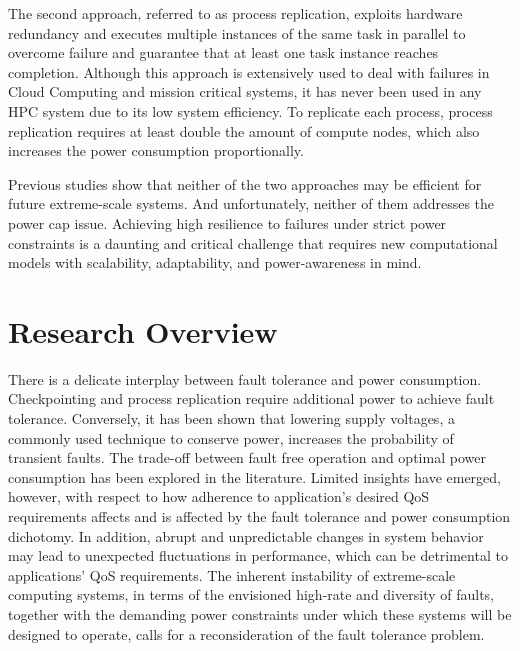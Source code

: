The second approach, referred to as process replication, exploits hardware redundancy and executes multiple instances of the same task 
in parallel to overcome failure and guarantee that at least one task instance reaches completion. Although this approach is extensively used 
to deal with failures in 
Cloud Computing and mission critical systems, it has 
never been used in any HPC system due to its low system efficiency. To replicate each process, process replication requires 
at least double the amount of compute nodes, which also increases the power consumption proportionally. 

Previous studies show that neither of the two approaches may be efficient for future extreme-scale systems. And unfortunately, neither 
of them addresses the power cap issue. 
Achieving high resilience to failures under strict power constraints is a daunting and critical challenge that requires new 
computational models with scalability, adaptability, and power-awareness in mind. 
 
\section{Research Overview}

There is a delicate interplay between fault tolerance and power consumption. Checkpointing and process replication require 
additional power to achieve fault tolerance. Conversely, it has been shown that lowering supply voltages, a commonly used 
technique to conserve power, increases the probability of transient faults. The trade-off between fault free operation and 
optimal power consumption has been explored in the literature. Limited insights have emerged, however, with respect to how 
adherence to application's desired QoS requirements affects and is affected by the fault tolerance and power consumption 
dichotomy. In addition, abrupt and unpredictable changes in system behavior may lead to unexpected fluctuations in performance, 
which can be detrimental to applications’ QoS requirements. The inherent instability of extreme-scale computing systems, 
in terms of the envisioned high-rate and diversity of faults, together with the demanding power constraints under which 
these systems will be designed to operate, calls for a 
reconsideration of the fault tolerance problem.

